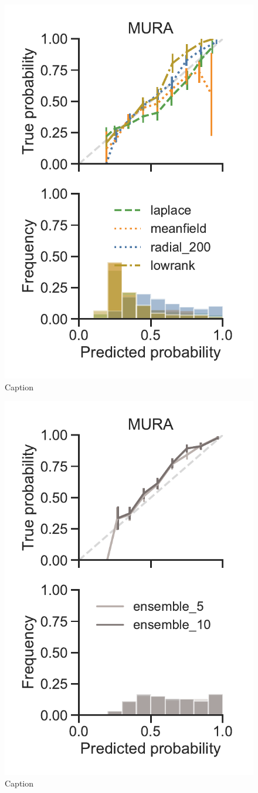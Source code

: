 \documentclass[10pt,a4paper,twocolumn]{article}
\begin{document}
%
\begin{figure}
    \centering
    \includegraphics[width=0.55\linewidth]{figures/MuraVI.pdf}
    \caption{Caption}
    \label{fig:mura-cc-vi}
\end{figure}
\begin{figure}
    \centering
    \includegraphics[width=0.55\linewidth]{figures/MuraEnsembles.pdf}
    \caption{Caption}
    \label{fig:mura-cc-ensembles}
\end{figure}
\end{document}
